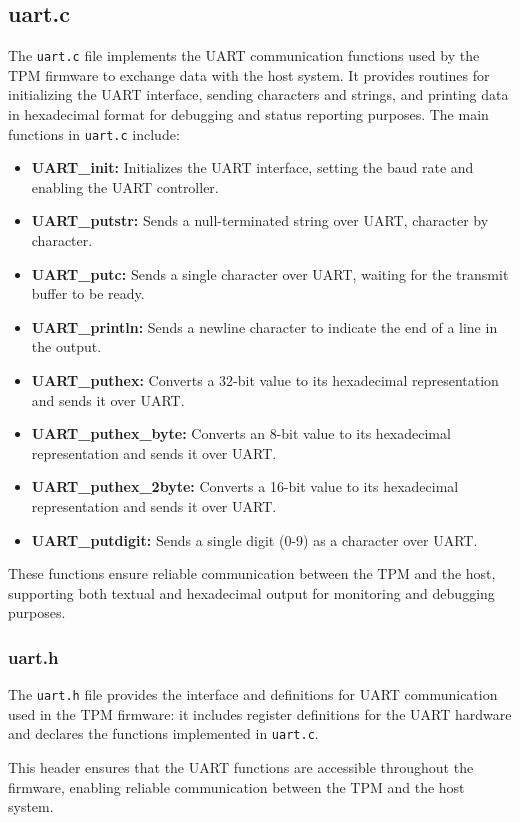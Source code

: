 \subsection{uart.c}
The \texttt{uart.c} file implements the UART
communication functions used by the TPM firmware to 
exchange data with the host system. It provides routines
for initializing the UART interface, sending characters 
and strings, and printing data in hexadecimal format
for debugging and status reporting purposes. The main
functions in \texttt{uart.c} include:
\begin{itemize}
    \item \textbf{UART\_init:} Initializes the UART 
    interface, setting the baud rate and enabling the 
    UART controller.
    \item \textbf{UART\_putstr:} Sends a null-terminated 
    string over UART, character by character.
    \item \textbf{UART\_putc:} Sends a single character 
    over UART, waiting for the transmit buffer to be 
    ready.
    \item \textbf{UART\_println:} Sends a newline character 
    to indicate the end of a line in the output.
    \item \textbf{UART\_puthex:} Converts a 32-bit value 
    to its hexadecimal representation and sends it over 
    UART.
    \item \textbf{UART\_puthex\_byte:} Converts an 8-bit 
    value to its hexadecimal representation and sends it 
    over UART.
    \item \textbf{UART\_puthex\_2byte:} Converts a 16-bit 
    value to its hexadecimal representation and sends it 
    over UART.
    \item \textbf{UART\_putdigit:} Sends a single digit 
    (0-9) as a character over UART.
\end{itemize}

These functions ensure reliable communication between the 
TPM and the host, supporting both textual and hexadecimal 
output for monitoring and debugging purposes.

\subsubsection{uart.h}
The \texttt{uart.h} file provides the interface and 
definitions for UART communication used in the TPM 
firmware: it includes register definitions for the UART 
hardware and declares the functions implemented 
in \texttt{uart.c}.

This header ensures that the UART functions are accessible 
throughout the firmware, enabling reliable communication 
between the TPM and the host system.
